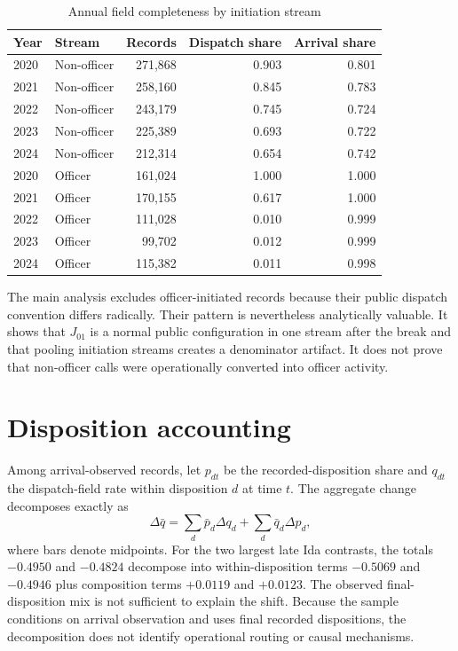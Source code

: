 \documentclass[11pt]{article}
\begin{document}
\begin{table}[t]
\centering
\caption{Annual field completeness by initiation stream}
\label{tab:annualinit}
\begin{tabular}{@{}llrrr@{}}
\toprule
Year & Stream & Records & Dispatch share & Arrival share \\
\midrule
2020 & Non-officer & 271,868 & 0.903 & 0.801 \\
2021 & Non-officer & 258,160 & 0.845 & 0.783 \\
2022 & Non-officer & 243,179 & 0.745 & 0.724 \\
2023 & Non-officer & 225,389 & 0.693 & 0.722 \\
2024 & Non-officer & 212,314 & 0.654 & 0.742 \\
\midrule
2020 & Officer & 161,024 & 1.000 & 1.000 \\
2021 & Officer & 170,155 & 0.617 & 1.000 \\
2022 & Officer & 111,028 & 0.010 & 0.999 \\
2023 & Officer & 99,702 & 0.012 & 0.999 \\
2024 & Officer & 115,382 & 0.011 & 0.998 \\
\bottomrule
\end{tabular}
\end{table}

The main analysis excludes officer-initiated records because their public dispatch convention differs radically. Their pattern is nevertheless analytically valuable. It shows that $J_{01}$ is a normal public configuration in one stream after the break and that pooling initiation streams creates a denominator artifact. It does not prove that non-officer calls were operationally converted into officer activity.

\section{Disposition accounting}

Among arrival-observed records, let $p_{dt}$ be the recorded-disposition share and $q_{dt}$ the dispatch-field rate within disposition $d$ at time $t$. The aggregate change decomposes exactly as
\begin{equation}
\Delta \bar q
=\sum_d \bar p_d\Delta q_d+\sum_d \bar q_d\Delta p_d,
\end{equation}
where bars denote midpoints. For the two largest late Ida contrasts, the totals $-0.4950$ and $-0.4824$ decompose into within-disposition terms $-0.5069$ and $-0.4946$ plus composition terms $+0.0119$ and $+0.0123$. The observed final-disposition mix is not sufficient to explain the shift. Because the sample conditions on arrival observation and uses final recorded dispositions, the decomposition does not identify operational routing or causal mechanisms.
\end{document}
